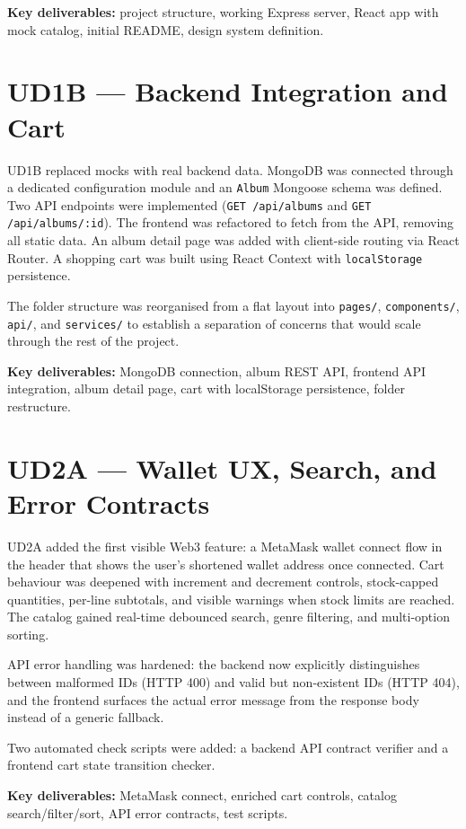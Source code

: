 \documentclass[11pt, a4paper]{report}
\begin{document}
\textbf{Key deliverables:} project structure, working Express server, React app with mock catalog, initial README, design system definition.

\section{UD1B — Backend Integration and Cart}

UD1B replaced mocks with real backend data. MongoDB was connected through a dedicated configuration module and an \texttt{Album} Mongoose schema was defined. Two API endpoints were implemented (\texttt{GET /api/albums} and \texttt{GET /api/albums/:id}). The frontend was refactored to fetch from the API, removing all static data. An album detail page was added with client-side routing via React Router. A shopping cart was built using React Context with \texttt{localStorage} persistence.

The folder structure was reorganised from a flat layout into \texttt{pages/}, \texttt{components/}, \texttt{api/}, and \texttt{services/} to establish a separation of concerns that would scale through the rest of the project.

\textbf{Key deliverables:} MongoDB connection, album REST API, frontend API integration, album detail page, cart with localStorage persistence, folder restructure.

\section{UD2A — Wallet UX, Search, and Error Contracts}

UD2A added the first visible Web3 feature: a MetaMask wallet connect flow in the header that shows the user's shortened wallet address once connected. Cart behaviour was deepened with increment and decrement controls, stock-capped quantities, per-line subtotals, and visible warnings when stock limits are reached. The catalog gained real-time debounced search, genre filtering, and multi-option sorting.

API error handling was hardened: the backend now explicitly distinguishes between malformed IDs (HTTP 400) and valid but non-existent IDs (HTTP 404), and the frontend surfaces the actual error message from the response body instead of a generic fallback.

Two automated check scripts were added: a backend API contract verifier and a frontend cart state transition checker.

\textbf{Key deliverables:} MetaMask connect, enriched cart controls, catalog search/filter/sort, API error contracts, test scripts.
\end{document}
